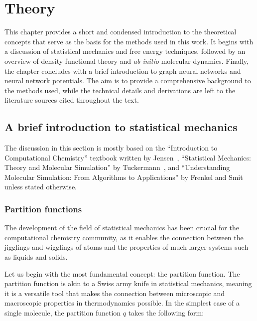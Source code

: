 \chapter{Theory}
This chapter provides a short and condensed introduction to the theoretical concepts that serve as the basis for the methods used in this work. It begins with a discussion of statistical mechanics and free energy techniques, followed by an overview of density functional theory and \textit{ab initio} molecular dynamics. Finally, the chapter concludes with a brief introduction to graph neural networks and neural network potentials. The aim is to provide a comprehensive background to the methods used, while the technical details and derivations are left to the literature sources cited throughout the text.



\section{A brief introduction to statistical mechanics}
The discussion in this section is mostly based on the ``Introduction to Computational Chemistry'' textbook written by Jensen~\citep{jensenIntroductionComputationalChemistry2017}, ``Statistical Mechanics: Theory and Molecular Simulation'' by Tuckermann~\citep{tuckermanStatisticalMechanicsTheory2023}, and ``Understanding Molecular Simulation: From Algorithms to Applications'' by Frenkel and Smit~\citep{frenkelUnderstandingMolecularSimulation2002} unless stated otherwise.



\subsection{Partition functions}
The development of the field of statistical mechanics has been crucial for the computational chemistry community, as it enables the connection between the jigglings and wigglings of atoms and the properties of much larger systems such as liquids and solids.

Let us begin with the most fundamental concept: the partition function. The partition function is akin to a Swiss army knife in statistical mechanics, meaning it is a versatile tool that makes the connection between microscopic and macroscopic properties in thermodynamics possible. In the simplest case of a single molecule, the partition function $q$ takes the following form:

